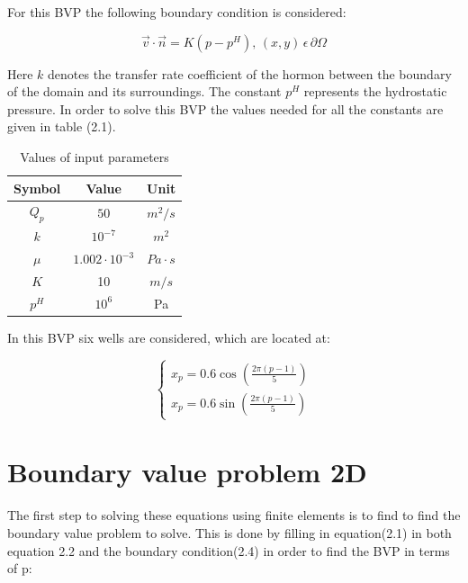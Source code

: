 \documentclass[a4paper]{report}
\begin{document}
\medskip

For this BVP the following boundary condition is considered: 

\begin{equation}
	\vec{v}\cdot\vec{n}=K(p-p^H), \, (x,y)\, \epsilon\,  \partial\Omega
\end{equation}
\bigskip

Here $k$ denotes the transfer rate coefficient of the hormon between the boundary of the domain and its surroundings. The constant $p^H$ represents the hydrostatic pressure. In order to solve this BVP the values needed for all the constants are given in table (2.1).


\begin{table}[ht]
	\caption{Values of input parameters} %
	\centering %
	\begin{tabular}{c c c} %
		\hline\hline %
		Symbol & Value & Unit\\ [0.5ex] %
		\hline %
		$Q_p$ & $50$ & $m^2/s$ \\ %
		$k$ & $10^{-7}$ & $m^2$ \\
		$\mu$ & $1.002\cdot 10^{-3}$ & $Pa\cdot s$ \\
		$K$ & 10 & $m/s$ \\
		$p^H$ & $10^6$ & Pa \\ [1ex] %
		\hline %
	\end{tabular}
	\label{table:nonlin} %
\end{table}
\bigskip

In this BVP six wells are considered, which are located at:


\begin{equation}
	\begin{cases} 
		x_p=0.6\cos(\frac{2\pi (p-1)}{5}) \\ x_p=0.6\sin(\frac{2\pi (p-1)}{5})
	\end{cases} 
\end{equation}


\section{Boundary value problem 2D}
The first step to solving these equations using finite elements is to find to find the boundary value problem to solve. This is done by filling in equation(2.1) in both equation 2.2 and the boundary condition(2.4) in order to find the BVP in terms of p:
\vspace{5mm}
\end{document}
